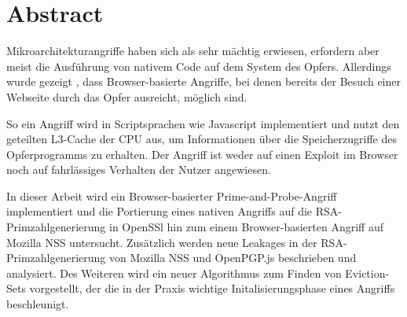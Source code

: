 \chapter*{Abstract}


Mikroarchitekturangriffe haben sich als sehr mächtig erwiesen, erfordern aber meist die Ausführung von nativem Code auf dem System des Opfers.
Allerdings wurde gezeigt \cite{TheSpyInTheSandbox}, dass Browser-basierte Angriffe, bei denen bereits der Besuch einer Webseite durch das Opfer ausreicht, möglich sind.

So ein Angriff wird in Scriptsprachen wie Javascript implementiert und nutzt den geteilten L3-Cache der CPU aus, um Informationen über die Speicherzugriffe des Opferprogramms zu erhalten.
Der Angriff ist weder auf einen Exploit im Browser noch auf fahrlässiges Verhalten der Nutzer angewiesen.




In dieser Arbeit wird ein Browser-basierter Prime-and-Probe-Angriff implementiert und die Portierung eines nativen Angriffs auf die RSA-Primzahlgenerierung \cite{RSAKeyGeneration2} in OpenSSl hin zum einem Browser-basierten Angriff auf Mozilla NSS untersucht.
Zusätzlich werden neue Leakages in der RSA-Primzahlgenerierung von Mozilla NSS und OpenPGP.js beschrieben und analysiert.
Des Weiteren wird ein neuer Algorithmus zum Finden von Eviction-Sets vorgestellt, der die in der Praxis wichtige Initalisierungsphase eines Angriffs beschleunigt. 


